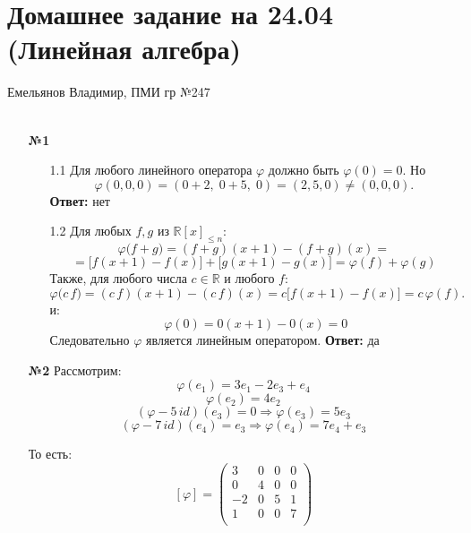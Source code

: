 \documentclass[a4paper]{article}
\renewcommand{\phi}{\varphi}
\newcommand{\RR}{\mathbb{R}}
\begin{document}
\section*{Домашнее задание на 24.04 (Линейная алгебра)}
 {\large Емельянов Владимир, ПМИ гр №247}\\\\
\begin{enumerate}
    \item[\textbf{№1}]\begin{enumerate}
        \item[1.1]Для любого линейного оператора $\phi$ должно быть $\phi(0)=0$.  
        Но  
        \[
          \phi(0,0,0) = (0+2,\;0+5,\;0) = (2,5,0) \neq (0,0,0).
        \]  
        \textbf{Ответ: } нет\\

        \item[1.2]Для любых \(f,g\) из \(\RR[x]_{\le n}\):
        $$
          \phi\bigl(f+g\bigr) = (f+g)(x+1) - (f+g)(x)=$$
          $$
            = \bigl[f(x+1)-f(x)\bigr] + \bigl[g(x+1)-g(x)\bigr]
            = \phi(f) + \phi(g)
        $$
        Также, для любого числа \(c\in\RR\) и любого \(f\):
        \[
          \phi\bigl(c\,f\bigr) = (c\,f)(x+1) - (c\,f)(x)
                           = c\bigl[f(x+1)-f(x)\bigr]
                           = c\,\phi(f).
        \]
        и:
        \[\;\phi(0)=0(x+1)-0(x)=0\]
        Следовательно $\phi$ является линейным оператором.
        \textbf{Ответ: } да\\
    \end{enumerate}
    \item[\textbf{№2}]Рассмотрим:
    $$ \varphi(e_1) = 3e_1 - 2e_3 + e_4$$
    $$ \varphi(e_2) = 4e_2$$
    $$(\varphi - 5 \, id)(e_3) = 0 \Rightarrow \varphi(e_3) = 5e_3$$
    $$(\varphi - 7 \, id)(e_4) = e_3 \Rightarrow \varphi(e_4) = 7e_4 + e_3$$

   То есть:
   \[
   [\varphi] =
   \begin{pmatrix}
   3 & 0 & 0 & 0 \\
   0 & 4 & 0 & 0 \\
   -2 & 0 & 5 & 1 \\
   1 & 0 & 0 & 7 \\
   \end{pmatrix}
   \]


\end{enumerate}
\end{document}
